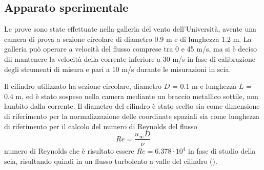 \documentclass{article} %
\begin{document}
\subsection{Apparato sperimentale}
Le prove sono state effettuate nella galleria del vento dell'Università, avente una camera di prova a sezione circolare di diametro 0.9 m e di lunghezza 1.2 m. La galleria può operare a velocità del flusso comprese tra 0 e 45 m/s, ma si è deciso dii mantenere la velocità della corrente inferiore a 30 m/s in fase di calibrazione degli strumenti di misura e pari a 10 m/s durante le misurazioni in scia.\par
Il cilindro utilizzato ha sezione circolare, diametro $D$ = 0.1 m e lunghezza $L$ = 0.4 m, ed è stato sospeso nella camera mediante un braccio metallico sottile, non lambito dalla corrente. Il diametro del cilindro è stato scelto sia come dimensione di riferimento per la normalizzazione delle coordinate spaziali
sia come lunghezza di riferimento per il calcolo del numero di Reynolds del flusso
\begin{equation*}
	Re = \frac{u_{\infty} D}{\nu}
\end{equation*}
numero di Reynolds che è risultato essere $Re = 6.378\cdot10^4$ in fase di studio della scia, risultando quindi in un flusso turbolento a valle del cilindro (\cite{norberg87}).
\end{document}
